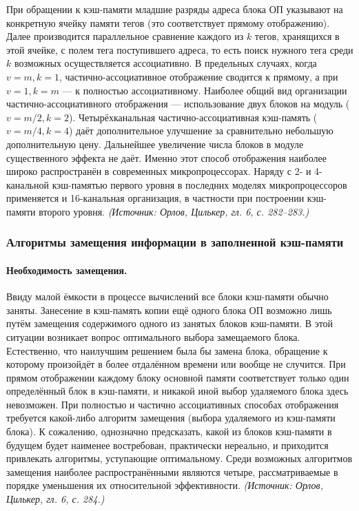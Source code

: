 \documentclass[a4paper,12pt]{article}
\begin{document}
При обращении к кэш-памяти младшие разряды адреса блока ОП указывают на конкретную ячейку памяти тегов (это соответствует прямому отображению). Далее производится параллельное сравнение каждого из \(k\) тегов, хранящихся в этой ячейке, с полем тега поступившего адреса, то есть поиск нужного тега среди \(k\) возможных осуществляется ассоциативно. В предельных случаях, когда \(v=m, k=1\), частично-ассоциативное отображение сводится к прямому, а при \(v=1, k=m\) --- к полностью ассоциативному. Наиболее общий вид организации частично-ассоциативного отображения --- использование двух блоков на модуль (\(v=m/2, k=2\)). Четырёхканальная частично-ассоциативная кэш-память (\(v=m/4, k=4\)) даёт дополнительное улучшение за сравнительно небольшую дополнительную цену. Дальнейшее увеличение числа блоков в модуле существенного эффекта не даёт. Именно этот способ отображения наиболее широко распространён в современных микропроцессорах. Наряду с 2- и 4-канальной кэш-памятью первого уровня в последних моделях микропроцессоров применяется и 16-канальная организация, в частности при построении кэш-памяти второго уровня.
\textit{(Источник: Орлов, Цилькер, гл. 6, с. 282--283.)}

\subsubsection{Алгоритмы замещения информации в заполненной кэш-памяти}

\paragraph{Необходимость замещения.}
Ввиду малой ёмкости в процессе вычислений все блоки кэш-памяти обычно заняты. Занесение в кэш-память копии ещё одного блока ОП возможно лишь путём замещения содержимого одного из занятых блоков кэш-памяти. В этой ситуации возникает вопрос оптимального выбора замещаемого блока. Естественно, что наилучшим решением была бы замена блока, обращение к которому произойдёт в более отдалённом времени или вообще не случится. При прямом отображении каждому блоку основной памяти соответствует только один определённый блок в кэш-памяти, и никакой иной выбор удаляемого блока здесь невозможен. При полностью и частично ассоциативных способах отображения требуется какой-либо алгоритм замещения (выбора удаляемого из кэш-памяти блока). К сожалению, однозначно предсказать, какой из блоков кэш-памяти в будущем будет наименее востребован, практически нереально, и приходится привлекать алгоритмы, уступающие оптимальному. Среди возможных алгоритмов замещения наиболее распространёнными являются четыре, рассматриваемые в порядке уменьшения их относительной эффективности.
\textit{(Источник: Орлов, Цилькер, гл. 6, с. 284.)}
\end{document}
